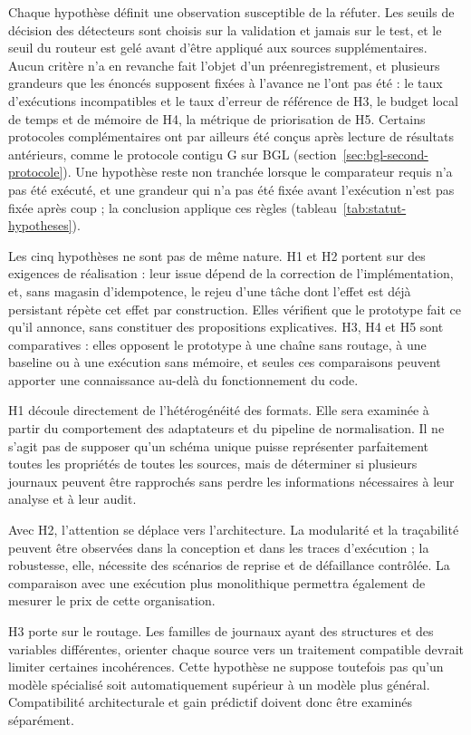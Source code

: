 Chaque hypothèse définit une observation susceptible de la réfuter. Les seuils de décision des détecteurs sont choisis sur la validation et jamais sur le test, et le seuil du routeur est gelé avant d'être appliqué aux sources supplémentaires. Aucun critère n'a en revanche fait l'objet d'un préenregistrement, et plusieurs grandeurs que les énoncés supposent fixées à l'avance ne l'ont pas été : le taux d'exécutions incompatibles et le taux d'erreur de référence de H3, le budget local de temps et de mémoire de H4, la métrique de priorisation de H5. Certains protocoles complémentaires ont par ailleurs été conçus après lecture de résultats antérieurs, comme le protocole contigu G sur BGL (section~\ref{sec:bgl-second-protocole}). Une hypothèse reste non tranchée lorsque le comparateur requis n'a pas été exécuté, et une grandeur qui n'a pas été fixée avant l'exécution n'est pas fixée après coup ; la conclusion applique ces règles (tableau~\ref{tab:statut-hypotheses}).

Les cinq hypothèses ne sont pas de même nature. H1 et H2 portent sur des exigences de réalisation : leur issue dépend de la correction de l'implémentation, et, sans magasin d'idempotence, le rejeu d'une tâche dont l'effet est déjà persistant répète cet effet par construction. Elles vérifient que le prototype fait ce qu'il annonce, sans constituer des propositions explicatives. H3, H4 et H5 sont comparatives : elles opposent le prototype à une chaîne sans routage, à une baseline ou à une exécution sans mémoire, et seules ces comparaisons peuvent apporter une connaissance au-delà du fonctionnement du code.

H1 découle directement de l'hétérogénéité des formats. Elle sera examinée à partir du comportement des adaptateurs et du pipeline de normalisation. Il ne s'agit pas de supposer qu'un schéma unique puisse représenter parfaitement toutes les propriétés de toutes les sources, mais de déterminer si plusieurs journaux peuvent être rapprochés sans perdre les informations nécessaires à leur analyse et à leur audit.

Avec H2, l'attention se déplace vers l'architecture. La modularité et la traçabilité peuvent être observées dans la conception et dans les traces d'exécution ; la robustesse, elle, nécessite des scénarios de reprise et de défaillance contrôlée. La comparaison avec une exécution plus monolithique permettra également de mesurer le prix de cette organisation.

H3 porte sur le routage. Les familles de journaux ayant des structures et des variables différentes, orienter chaque source vers un traitement compatible devrait limiter certaines incohérences. Cette hypothèse ne suppose toutefois pas qu'un modèle spécialisé soit automatiquement supérieur à un modèle plus général. Compatibilité architecturale et gain prédictif doivent donc être examinés séparément.


